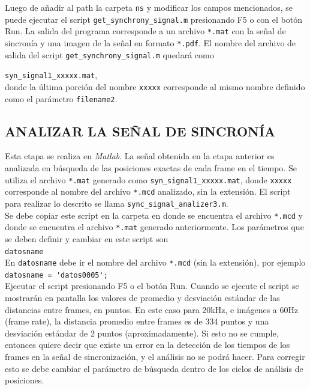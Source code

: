 \documentclass[10pt]{article}
\begin{document}
Luego de añadir al path la carpeta \verb+ns+ y modificar los campos mencionados, se puede ejecutar el script \verb+get_synchrony_signal.m+ presionando F5 o con el botón Run. La salida del programa corresponde a un archivo \verb+*.mat+ con la señal de sincronía y una imagen de la señal en formato \verb+*.pdf+. El nombre del archivo de salida del script \verb+get_synchrony_signal.m+ quedará como 

\verb+syn_signal1_xxxxx.mat+, \\

donde la última porción del nombre \verb+xxxxx+ corresponde al mismo nombre definido como el parámetro \verb+filename2+. \\

\newpage

\subsection{ ANALIZAR LA SEÑAL DE SINCRONÍA }

Esta etapa se realiza en \textit{Matlab}. La señal obtenida en la etapa anterior es analizada en búsqueda de las posiciones exactas de cada frame en el tiempo. Se utiliza el archivo \verb+*.mat+ generado como \verb+syn_signal1_xxxxx.mat+, donde \verb+xxxxx+ corresponde al nombre del archivo \verb+*.mcd+ analizado, sin la extensión. El script para realizar lo descrito se llama \verb+sync_signal_analizer3.m+. \\

Se debe copiar este script en la carpeta en donde se encuentra el archivo \verb+*.mcd+ y donde se encuentra el archivo \verb+*.mat+ generado anteriormente. Los parámetros que se deben definir y cambiar en este script son \\

\verb+datosname+ \\

En \verb+datosname+ debe ir el nombre del archivo \verb+*.mcd+ (sin la extensión), por ejemplo \\

\verb+datosname = 'datos0005';+ \\

Ejecutar el script presionando F5 o el botón Run. Cuando se ejecute el script se mostrarán en pantalla los valores de promedio y desviación estándar de las distancias entre frames, en puntos. En este caso para 20kHz, e imágenes a 60Hz (frame rate), la distancia promedio entre frames es de 334 puntos y una desviación estándar de 2 puntos (aproximadamente). Si esto no se cumple, entonces quiere decir que existe un error en la detección de los tiempos de los frames en la señal de sincronización, y el análisis no se podrá hacer. Para corregir esto se debe cambiar el parámetro de búsqueda dentro de los ciclos de análisis de posiciones. \\
\end{document}
